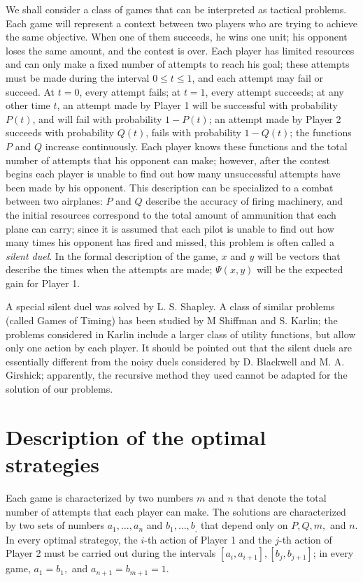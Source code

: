 \documentclass{article}
\begin{document}
We shall consider a class of games that can be interpreted as tactical
problems. Each game will represent a context between two players who are trying
to achieve the same objective. When one of them succeeds, he wins one unit; his
opponent loses the same amount, and the contest is over. Each player has
limited resources and can only make a fixed number of attempts to reach his
goal; these attempts must be made during the interval $0 \leq t \leq 1$, and
each attempt may fail or succeed. At $t=0$, every attempt fails; at $t=1$,
every attempt succeeds; at any other time $t$, an attempt made by Player 1 will
be successful with probability $P(t)$, and will fail with probability $1 -
P(t)$; an attempt made by Player 2 succeeds with probability $Q(t)$, fails with
probability $1- Q(t)$; the functions $P$ and $Q$ increase continuously. Each
player knows these functions and the total number of attempts that his opponent
can make; however, after the contest begins each player is unable to find out
how many unsuccessful attempts have been made by his opponent. This description
can be specialized to a combat between two airplanes: $P$ and $Q$ describe the
accuracy of firing machinery, and the initial resources correspond to the total
amount of ammunition that each plane can carry; since it is assumed that each
pilot is unable to find out how many times his opponent has fired and missed,
this problem is often called a \emph{silent duel}. In the formal description of
the game, $x$ and $y$ will be vectors that describe the times when the attempts
are made; $\Psi(x, y)$ will be the expected gain for Player 1.

A special silent duel was solved by L. S. Shapley. A class of similar problems
(called Games of Timing) has been studied by M Shiffman and S. Karlin; the
problems considered in Karlin include a larger class of utility functions, but
allow only one action by each player. It should be pointed out that the silent
duels are essentially different from the noisy duels considered by D. Blackwell
and M. A. Girshick; apparently, the recursive method they used cannot be
adapted for the solution of our problems.

\section{Description of the optimal strategies}

Each game is characterized by two numbers $m$ and $n$ that denote the total
number of attempts that each player can make. The solutions are characterized
by two sets of numbers $a_1, \dots, a_n$ and $b_1, \dots, b_,$ that depend only
on $P, Q, m,$ and $n$. In every optimal strategoy, the $i$-th action of Player
1 and the $j$-th action of Player 2 must be carried out during the intervals
$[a_i, a_{i+1}], [b_j, b_{j+1}]$; in every game, $a_1 = b_1,$ and $a_{n+1} =
b_{m+1} = 1$.
\end{document}
